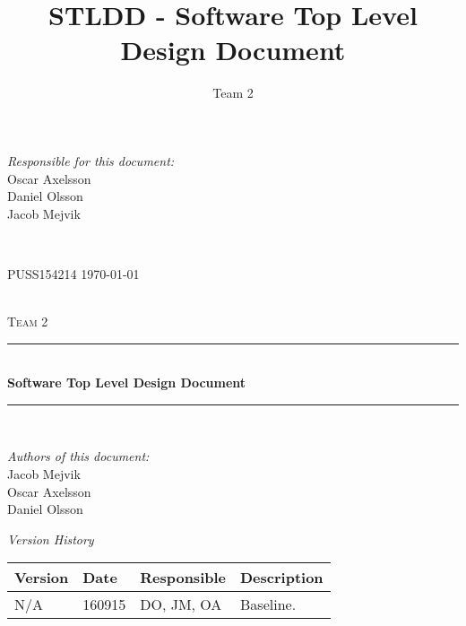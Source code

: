 \documentclass[a4paper]{article}
\title{STLDD - Software Top Level Design Document}
\author{Team 2}
\begin{document}
	\begin{titlepage}
		\newcommand{\HRule}{\rule{\linewidth}{0.5mm}}
		
		\begin{minipage}{0.5\textwidth}
			\begin{flushleft} %
				\textit{Responsible for this document:}\\
				Oscar Axelsson \\
				Daniel Olsson \\
				Jacob Mejvik
			\end{flushleft}
		\end{minipage}
		~
		\begin{minipage}{0.4\textwidth}
			\begin{flushright}
				PUSS154214
				\today
			\end{flushright}
		\end{minipage}\\[3cm]
		
		\centering
		\textsc{\LARGE Team 2}\\[0.5cm]
		
		\HRule \\[0.4cm]
		{ \huge \bfseries Software Top Level Design Document}\\[0.4cm] %
		\HRule \\[1.5cm]
		
		\vfill
		\begin{flushleft}
			\textit{Authors of this document:}\\
			Jacob Mejvik \\
			Oscar Axelsson \\
			Daniel Olsson
		\end{flushleft}
		
	\end{titlepage}
	\setcounter{tocdepth}{2}
	
	\begin{center}
		\textit{\large Version History}
		
		\begin{tabular}{ | l | l | l | p{5cm} |}
			\hline
			\textbf{Version} 	& \textbf{Date} 	& \textbf{Responsible} 	& \textbf{Description} 		\\ \hline
			N/A				 	& 160915 			& DO, JM, OA			&  Baseline. 				\\ \hline
		\end{tabular}
	\end{center}
	
\end{document}
